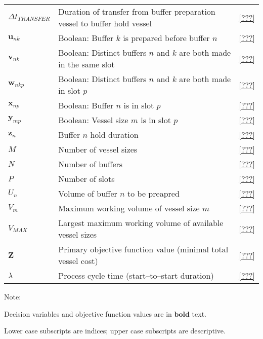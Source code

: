 {\begin{tabular}{l p{9.5cm} r}
$\Delta t_{TRANSFER}$ & Duration of transfer from buffer preparation vessel to 
    buffer hold vessel & \ref{???}\\
$\boldsymbol{u}_{nk}$ & Boolean: Buffer $k$ is prepared before buffer $n$
    & \ref{???}\\
$\boldsymbol{v}_{nk}$ & Boolean: Distinct buffers $n$ and $k$ are both made in
    the same slot& \ref{???}\\
$\boldsymbol{w}_{nkp}$ & Boolean: Distinct buffers $n$ and $k$ are both made in
    slot $p$ & \ref{???}\\
$\boldsymbol{x}_{np}$ & Boolean: Buffer $n$ is in slot $p$ & \ref{???}\\
$\boldsymbol{y}_{mp}$ & Boolean: Vessel size $m$ is in slot $p$ & \ref{???}\\
$\boldsymbol{z}_{n}$ & Buffer $n$ hold duration & \ref{???}\\
$M$ & Number of vessel sizes & \ref{???}\\
$N$ & Number of buffers & \ref{???}\\
$P$ & Number of slots & \ref{???}\\
$U_{n}$ & Volume of buffer $n$ to be preapred & \ref{???}\\
$V_{m}$ & Maximum working volume of vessel size $m$ & \ref{???}\\
$V_{MAX}$ & Largest maximum working volume of available vessel sizes
    & \ref{???}\\
$\boldsymbol{Z}$ & Primary objective function value (minimal total vessel cost) 
    & \ref{???}\\
$\lambda$ & Process cycle time (start--to--start duration) & \ref{???}\\
\end{tabular}

Note:

Decision variables and objective function values are in $\boldsymbol{bold}$
text.

Lower case subscripts are indices; upper case subscripts are descriptive.

}

